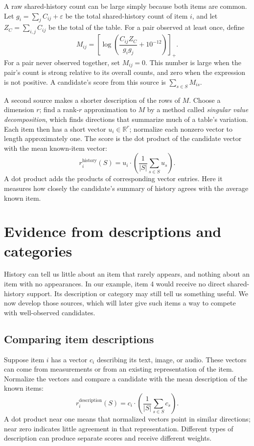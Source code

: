 \documentclass[11pt,a4paper]{article}
\newcommand{\R}{\mathbb R}\newcommand{\I}{\mathcal I}\newcommand{\diag}{\operatorname{diag}}
\numberwithin{equation}{section}
\begin{document}
A raw shared-history count can be large simply because both items are common. Let
$g_i=\sum_j C_{ij}+\varepsilon$ be the total shared-history count of item $i$, and let
$Z_C=\sum_{i,j}C_{ij}$ be the total of the table. For a pair observed at least once, define
\begin{equation}\label{pmi}
 M_{ij}=\left[\log\left(\frac{C_{ij}Z_C}{g_i g_j}+10^{-12}\right)\right]_+.
\end{equation}
For a pair never observed together, set $M_{ij}=0$. This number is large when the pair's
count is strong relative to its overall counts, and zero when the expression is not positive.
A candidate's score from this source is $\sum_{s\in S}M_{is}$.

A second source makes a shorter description of the rows of $M$. Choose a dimension $r$;
find a rank-$r$ approximation to $M$ by a method called \emph{singular value decomposition},
which finds directions that summarize much of a table's variation. Each item then has a
short vector $u_i\in\R^r$; normalize each nonzero vector to length approximately one.
The score is the dot product of the candidate vector with the mean known-item vector:
\begin{equation}\label{meanfeature}
 r_i^{\mathrm{history}}(S)=u_i\cdot\left(\frac1{|S|}\sum_{s\in S}u_s\right).
\end{equation}
A dot product adds the products of corresponding vector entries. Here it measures how
closely the candidate's summary of history agrees with the average known item.

\section{Evidence from descriptions and categories}\label{content}
History can tell us little about an item that rarely appears, and nothing about an item
with no appearances. In our example, item 4 would receive no direct shared-history support.
Its description or category may still tell us something useful. We now develop those sources,
which will later give such items a way to compete with well-observed candidates.

\subsection{Comparing item descriptions}
Suppose item $i$ has a vector $c_i$ describing its text, image, or audio. These vectors
can come from measurements or from an existing representation of the item. Normalize the
vectors and compare a candidate with the mean description of the known items:
\begin{equation}
 r_i^{\mathrm{description}}(S)=c_i\cdot\left(\frac1{|S|}\sum_{s\in S}c_s\right).
\end{equation}
A dot product near one means that normalized vectors point in similar directions; near
zero indicates little agreement in that representation. Different types of description
can produce separate scores and receive different weights.
\end{document}
